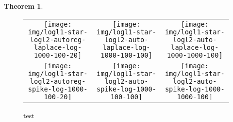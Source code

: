 \documentclass[twoside]{article}
\newtheorem{theorem}{Theorem}
\newtheorem{lemma}{Lemma}
\newcommand{\Wave}{{\mathcal{\hat W}^{ave}}}
\newcommand{\w}{\theta}
\newcommand{\wmle}{\hat\w^{mle}}
\newcommand{\wstar}{{\w^{*}}}
\newcommand{\ltwo}[1]{{\lVert {#1} \rVert}}
\newcommand{\proj}[1]{\pi_{{#1}}}
\newcommand{\ignore}[1]{}
\begin{document}
{\begin{theorem}

\end{theorem}

\ignore{
\subsection{Overall growth}

In this section we assume the following regularity conditions.

\begin{theorem}
Assume conditions (1-5) above hold.
Then in the limit as $n$ approaches $\infty$:
\begin{enumerate}
\item
If $f$ is locally $\sigma$-strongly convex around $\wstar$
\begin{equation}
\Pr{a}
\end{equation}
\item
If $f$ is locally $\ell$-Lipschitz around $\wstar$
(i.e. ),
then
\begin{equation}
\end{equation}
\end{enumerate}
\end{theorem}

\begin{lemma}
\label{lem:normaff}
Let $W : \mathbb{R}^{d\times m}$ be a random matrix where each entry is distributed as a standard Gaussian.
Let $\Wave$ be the affine hull of the columns of $W$;
that is,
\begin{equation}
\Wave = \left\{\sum_{i=1}^m c_i\wmle_i : c\in\mathbb{R}, \sum_{i=1}^m c_i = 1 \right\}
\end{equation}
Then for all $t$,
\begin{equation}
\Pr\left[\ltwo{\proj{W}0}^2 > O(t(1-m/d))\right] \le 1 - \exp(-t)
\end{equation}
\end{lemma}
}
}

\begin{figure*}[ht!]
\begin{tabular}{ccc}
  \texttt{[image: img/logl1-star-logl2-autoreg-laplace-log-1000-100-20]}
& \texttt{[image: img/logl1-star-logl2-auto-laplace-log-1000-100-100]}
& \texttt{[image: img/logl1-star-logl2-auto-laplace-log-1000-1000-100]}
\\
  \texttt{[image: img/logl1-star-logl2-autoreg-spike-log-1000-100-20]}
& \texttt{[image: img/logl1-star-logl2-auto-spike-log-1000-100-100]}
& \texttt{[image: img/logl1-star-logl2-auto-spike-log-1000-1000-100]}
\end{tabular}
\caption{test}
\label{fig:lambda}
\end{figure*}
\end{document}
